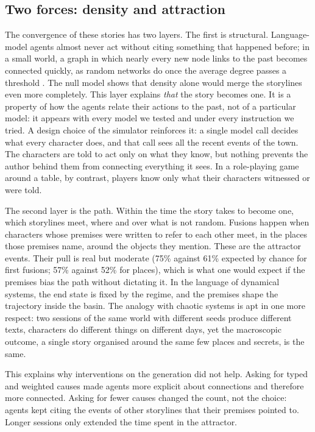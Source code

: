 \documentclass[12pt]{article}
\begin{document}
\subsection{Two forces: density and attraction}

The convergence of these stories has two layers. The first is structural.
Language-model agents almost never act without citing something that
happened before; in a small world, a graph in which nearly every new node
links to the past becomes connected quickly, as random networks do once the
average degree passes a threshold \parencite{newman2018}. The null model
shows that density alone would merge the storylines even more completely. This
layer explains \emph{that} the story becomes one. It is a property of how
the agents relate their actions to the past, not of a particular model:
it appears with every model we tested and under every instruction we tried. A design choice of the simulator reinforces it: a single model
call decides what every character does, and that call sees all the recent
events of the town. The characters are told to act only on what they know,
but nothing prevents the author behind them from connecting everything it
sees. In a role-playing game around a table, by contrast, players know only
what their characters witnessed or were told.

The second layer is the path. Within the time the story takes to become
one, which storylines meet, where and over what is not random. Fusions
happen when characters whose premises were written to refer to each other
meet, in the places those premises name, around the objects they mention.
These are the attractor events. Their pull is real but moderate (75\%
against 61\% expected by chance for first fusions; 57\% against 52\% for
places), which is what one would expect if the premises bias the path
without dictating it. In the language of dynamical systems, the end state is
fixed by the regime, and the premises shape the trajectory inside the
basin. The analogy with chaotic systems is apt in one more respect: two
sessions of the same world with different seeds produce different texts,
characters do different things on different days, yet the macroscopic
outcome, a single story organised around the same few places and secrets, is
the same.

This explains why interventions on the generation did not help. Asking for
typed and weighted causes made agents more explicit about connections and
therefore more connected. Asking for fewer causes changed the count, not the
choice: agents kept citing the events of other storylines that their
premises pointed to. Longer sessions only extended the time spent in the
attractor.
\end{document}
